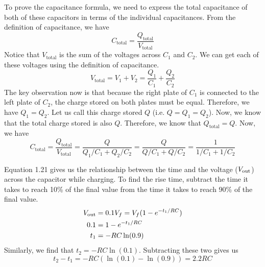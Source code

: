 \documentclass{article}
\begin{document}
    To prove the capacitance formula, we need to express the total capacitance of both of these capacitors in terms of the individual capacitances. From the definition of capacitance, we have 
    \[C_\text{total} = \frac{Q_\text{total}}{V_\text{total}}\]
    Notice that $V_\text{total}$ is the sum of the voltages across $C_1$ and $C_2$. We can get each of these voltages using the definition of capacitance.
    \[V_\text{total} = V_1 + V_2 = \frac{Q_1}{C_1} + \frac{Q_2}{C_2}\]
    The key observation now is that because the right plate of $C_1$ is connected to the left plate of $C_2$, the charge stored on both plates must be equal. \footnotemark Therefore, we have $Q_1 = Q_2$. Let us call this charge stored $Q$ (i.e. $Q = Q_1 = Q_2$). Now, we know that the total charge stored is also $Q$. \footnotemark Therefore, we know that $Q_\text{total} = Q$. Now, we have 
    \[C_\text{total} = \frac{Q_\text{total}}{V_\text{total}} = \frac{Q}{Q_1/C_1 + Q_2/C_2} = \frac{Q}{Q/C_1 + Q/C_2} = \frac{1}{1/C_1 + 1/C_2}\]



    Equation 1.21 gives us the relationship between the time and the voltage ($V_{\text{out}}$) across the capacitor while charging. To find the rise time, subtract the time it takes to reach 10\% of the final value from the time it takes to reach 90\% of the final value.
    \begin{align*}
        V_{\text{out}} &= 0.1V_f = V_f(1-e^{-t_1/RC}) \\
        0.1 &= 1 - e^{-t_1/RC}\\ 
        t_1 &= -RC \ln(0.9)
    \end{align*}
    Similarly, we find that $t_2 = -RC \ln(0.1)$. Subtracting these two gives us 
    \[t_2 - t_1 = -RC(\ln(0.1) - \ln(0.9)) = 2.2RC\]
\end{document}
